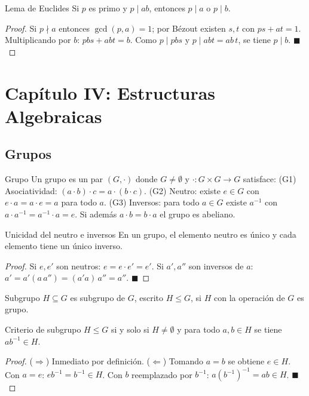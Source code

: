 \documentclass[12pt]{article}
\begin{document}
\begin{teorema}[2.3]{Lema de Euclides}
Si $p$ es primo y $p \mid ab$, entonces $p \mid a$ o $p \mid b$.
\end{teorema}
\begin{proof}
Si $p \nmid a$ entonces $\gcd(p,a) = 1$; por Bézout existen $s,t$ con $ps + at = 1$. Multiplicando por $b$: $pbs + abt = b$. Como $p \mid pbs$ y $p \mid abt = ab\,t$, se tiene $p \mid b$. $\blacksquare$
\end{proof}

\section{Capítulo IV: Estructuras Algebraicas}

\subsection{Grupos}

\begin{definicion}[4.1]{Grupo}
Un grupo es un par $(G, \cdot)$ donde $G \neq \emptyset$ y $\cdot : G \times G \to G$ satisface:
(G1) Asociatividad: $(a \cdot b) \cdot c = a \cdot (b \cdot c)$.
(G2) Neutro: existe $e \in G$ con $e \cdot a = a \cdot e = a$ para todo $a$.
(G3) Inversos: para todo $a \in G$ existe $a^{-1}$ con $a \cdot a^{-1} = a^{-1} \cdot a = e$.
Si además $a \cdot b = b \cdot a$ el grupo es abeliano.
\end{definicion}

\begin{proposicion}[4.1]{Unicidad del neutro e inversos}
En un grupo, el elemento neutro es único y cada elemento tiene un único inverso.
\end{proposicion}
\begin{proof}
Si $e, e'$ son neutros: $e = e \cdot e' = e'$. Si $a', a''$ son inversos de $a$: $a' = a'(a\,a'') = (a'a)\,a'' = a''$. $\blacksquare$
\end{proof}

\begin{definicion}[4.2]{Subgrupo}
$H \subseteq G$ es subgrupo de $G$, escrito $H \leq G$, si $H$ con la operación de $G$ es grupo.
\end{definicion}

\begin{teorema}[4.1]{Criterio de subgrupo}
$H \leq G$ si y solo si $H \neq \emptyset$ y para todo $a,b \in H$ se tiene $ab^{-1} \in H$.
\end{teorema}
\begin{proof}
($\Rightarrow$) Inmediato por definición. ($\Leftarrow$) Tomando $a = b$ se obtiene $e \in H$. Con $a = e$: $eb^{-1} = b^{-1} \in H$. Con $b$ reemplazado por $b^{-1}$: $a(b^{-1})^{-1} = ab \in H$. $\blacksquare$
\end{proof}
\end{document}
